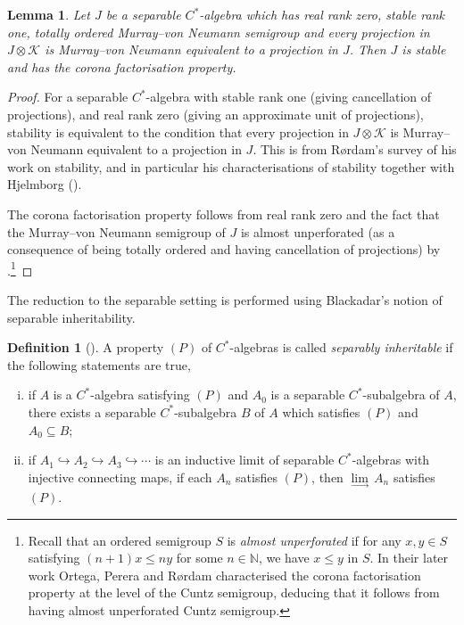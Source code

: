 \documentclass[reqno]{amsart}
\newtheorem{lem}[thm]{Lemma}
\theoremstyle{definition}
\newtheorem{defn}[thm]{Definition}
\theoremstyle{remark}
\numberwithin{equation}{section}
\theoremstyle{definition}
\begin{document}
\begin{lem}\label{separableideals}
Let $J$ be a separable $C^*$-algebra which has real rank zero, stable rank one, totally ordered Murray--von Neumann semigroup and every projection in $J\otimes\mathcal K$ is Murray--von Neumann equivalent to a projection in $J$. Then $J$ is stable and has the corona factorisation property.
\end{lem}
\begin{proof}
For a separable $C^*$-algebra with stable rank one (giving cancellation of projections), and real rank zero (giving an approximate unit of projections), stability is equivalent to the condition that every projection in $J\otimes\mathcal K$ is Murray--von Neumann equivalent to a projection in $J$. This is \cite[Proposition 3.4(i)$\Leftrightarrow$(ii)]{Rordam:Stable} from Rørdam's survey of his work on stability, and in particular his characterisations of stability together with Hjelmborg (\cite{Stability_RR0}).
    
The corona factorisation property follows from real rank zero and the fact that the Murray--von Neumann semigroup of $J$ is almost unperforated (as a consequence of being totally ordered and having cancellation of projections) by \cite[Corollary 5.9]{OPR:TAMS}.\footnote{Recall that an ordered semigroup $S$ is \emph{almost unperforated} if for any $x, y\in S$ satisfying $(n+1)x\leq ny$ for some $n\in \mathbb{N}$, we have $x\leq y$ in $S$. In their later work \cite{OPR:IMRN} Ortega, Perera and Rørdam characterised the corona factorisation property at the level of the Cuntz semigroup, deducing that it follows from having almost unperforated Cuntz semigroup. } 
\end{proof} 

The reduction to the separable setting is performed using Blackadar's notion of separable inheritability. 

\begin{defn}[{\cite[Section II.8.5]{Blackadar}}] 
\label{defn_si} 
A property $(P)$ of $C^*$-algebras is called \emph{separably inheritable} if the following statements are true, 
\begin{enumerate} [(i)] 
\item if $A$ is a $C^*$-algebra satisfying $(P)$ and $A_0$ is a separable $C^*$-subalgebra of $A$, there exists a separable $C^*$-subalgebra $B$ of $A$ which satisfies $(P)$ and $A_0\subseteq B $;
\item if $A_1 \hookrightarrow A_2 \hookrightarrow A_3 \hookrightarrow \cdots$ is an inductive limit of separable $C^*$-algebras with injective connecting maps, if each $A_n$ satisfies $(P)$, then $\underset{\longrightarrow}{\lim} \, A_n$ satisfies $(P)$.
\end{enumerate} 
\end{defn} 
\end{document}
